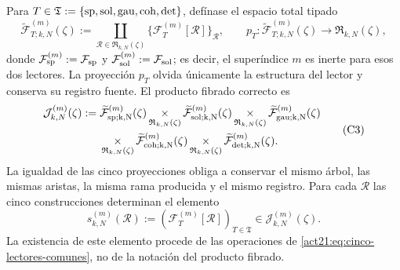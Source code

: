Para
\(T\in\mathfrak T:=\{{\rm sp},{\rm sol},{\rm gau},{\rm coh},{\rm det}\}\),
defínase el espacio total tipado
\[
 \widetilde{\mathcal F}_{T;k,N}^{(m)}(\zeta)
 :=\coprod_{\mathscr R\in\mathfrak R_{k,N}(\zeta)}
   \{\mathcal F_T^{(m)}[\mathscr R]\}_{\mathscr R},
 \qquad
 p_T:\widetilde{\mathcal F}_{T;k,N}^{(m)}(\zeta)
      \longrightarrow\mathfrak R_{k,N}(\zeta),
\]
donde
\(\mathcal F_{\rm sp}^{(m)}:=\mathcal F_{\rm sp}\) y
\(\mathcal F_{\rm sol}^{(m)}:=\mathcal F_{\rm sol}\); es decir, el
superíndice \(m\) es inerte para esos dos lectores.
La proyección \(p_T\) olvida únicamente la estructura del lector y conserva
su registro fuente. El producto fibrado correcto es
\[
\begin{aligned}
 \mathcal J_{k,N}^{(m)}(\zeta):={}&
 \widetilde{\mathcal F}_{\rm sp;k,N}^{(m)}(\zeta)
 \mathop{\times}_{\mathfrak R_{k,N}(\zeta)}
 \widetilde{\mathcal F}_{\rm sol;k,N}^{(m)}(\zeta)
 \mathop{\times}_{\mathfrak R_{k,N}(\zeta)}
 \widetilde{\mathcal F}_{\rm gau;k,N}^{(m)}(\zeta)\\
 &\mathop{\times}_{\mathfrak R_{k,N}(\zeta)}
 \widetilde{\mathcal F}_{\rm coh;k,N}^{(m)}(\zeta)
 \mathop{\times}_{\mathfrak R_{k,N}(\zeta)}
 \widetilde{\mathcal F}_{\rm det;k,N}^{(m)}(\zeta).
\end{aligned}
\tag{C3}
\label{act21:eq:constructor-correlativo}
\]
La igualdad de las cinco proyecciones obliga a conservar el mismo árbol, las
mismas aristas, la misma rama producida y el mismo registro. Para cada
\(\mathscr R\) las cinco construcciones determinan el elemento
\[
 s_{k,N}^{(m)}(\mathscr R)
 :=(\mathcal F_T^{(m)}[\mathscr R])_{T\in\mathfrak T}
 \in\mathcal J_{k,N}^{(m)}(\zeta).
\]
La existencia de este elemento procede de las operaciones de
\eqref{act21:eq:cinco-lectores-comunes}, no de la
notación del producto fibrado.

